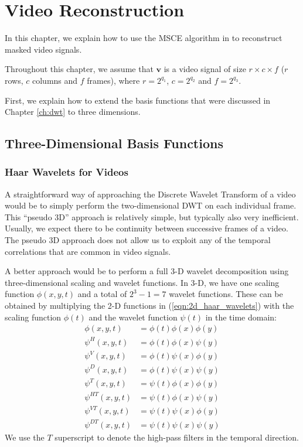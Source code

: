 \chapter{Video Reconstruction}
In this chapter, we explain how to use the MSCE algorithm in \cite{pilikos2014} to reconstruct masked video signals.

Throughout this chapter, we assume that $\bm v$ is a video signal of size $r\times c\times f$ ($r$ rows, $c$ columns and $f$ frames), where $r=2^{q_1}$, $c=2^{q_2}$ and $f=2^{q_3}$.

First, we explain how to extend the basis functions that were discussed in Chapter \ref{ch:dwt} to three dimensions.

\section{Three-Dimensional Basis Functions}
\subsection{Haar Wavelets for Videos}
A straightforward way of approaching the Discrete Wavelet Transform of a video would be to simply perform the two-dimensional DWT on each individual frame. 
This ``pseudo 3D'' approach is relatively simple, but typically also very inefficient.
Usually, we expect there to be continuity between successive frames of a video.
The pseudo 3D approach does not allow us to exploit any of the temporal correlations that are common in video signals.

A better approach would be to perform a full 3-D wavelet decomposition using three-dimensional scaling and wavelet functions.
In 3-D, we have one scaling function $\phi(x,y,t)$ and a total of $2^3-1=7$ wavelet functions.
These can be obtained by multiplying the 2-D functions in (\ref{eqn:2d_haar_wavelets}) with the scaling function $\phi(t)$ and the wavelet function $\psi(t)$ in the time domain:
\begin{equation*}
  \begin{split}
    \phi(x,y,t) &= \phi(t) \phi(x) \phi(y)\\
    \psi^H(x,y,t) &=\phi(t) \phi(x) \psi(y) \\
    \psi^V(x,y,t) &=\phi(t) \psi(x) \phi(y) \\
    \psi^D(x,y,t) &=\phi(t) \psi(x) \psi(y) \\
    \psi^T(x,y,t) &= \psi(t) \phi(x) \phi(y)\\
    \psi^{HT}(x,y,t) &=\psi(t) \phi(x) \psi(y) \\
    \psi^{VT}(x,y,t) &=\psi(t) \psi(x) \phi(y) \\
    \psi^{DT}(x,y,t) &=\psi(t) \psi(x) \psi(y)
  \end{split}
\end{equation*}
We use the $T$ superscript to denote the high-pass filters in the temporal direction.

